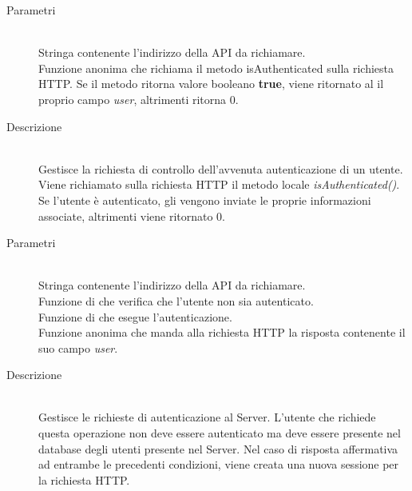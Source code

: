 \begin{description}
\begin{description}
\begin{mldescription}
 \begin{description}
  \item[Parametri]
   \begin{mldescription}
     \hfill \\
    Stringa contenente l'indirizzo della API da richiamare.
     \hfill \\
    Funzione anonima che richiama il metodo isAuthenticated sulla richiesta HTTP. Se il metodo ritorna valore booleano \textbf{true}, viene ritornato al  il proprio campo \textit{user}, altrimenti ritorna 0.
   \end{mldescription}
  \item[Descrizione] \hfill \\
 Gestisce la richiesta di controllo dell'avvenuta autenticazione di un utente. Viene richiamato sulla richiesta HTTP il metodo locale \textit{isAuthenticated()}. Se l'utente è autenticato, gli vengono inviate le proprie informazioni associate, altrimenti viene ritornato 0.
 \end{description}
 
 \begin{description}
  \item[Parametri]
   \begin{mldescription}
     \hfill \\
    Stringa contenente l'indirizzo della API da richiamare.
     \hfill \\
    Funzione di  che verifica che l'utente non sia autenticato.
     \hfill \\
    Funzione di  che esegue l'autenticazione.
     \hfill \\
    Funzione anonima che manda alla richiesta HTTP la risposta contenente il suo campo \textit{user}.
   \end{mldescription}
  \item[Descrizione] \hfill \\
 Gestisce le richieste di autenticazione al Server. L'utente che richiede questa operazione non deve essere autenticato ma deve essere presente nel database degli utenti presente nel Server. Nel caso di risposta affermativa ad entrambe le precedenti condizioni, viene creata una nuova sessione per la richiesta HTTP.
 \end{description}
 

\end{mldescription}
\end{description}
\end{description}
